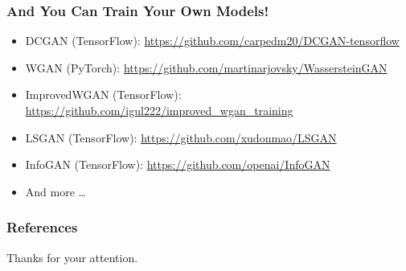 \begin{frame}
  \frametitle{And You Can Train Your Own Models!}
  \begin{itemize}
    \item DCGAN (TensorFlow):
      \url{https://github.com/carpedm20/DCGAN-tensorflow}
    \item WGAN (PyTorch):
      \url{https://github.com/martinarjovsky/WassersteinGAN}
    \item ImprovedWGAN (TensorFlow):
      \url{https://github.com/igul222/improved_wgan_training}
    \item LSGAN (TensorFlow):
      \url{https://github.com/xudonmao/LSGAN}
    \item InfoGAN (TensorFlow):
      \url{https://github.com/openai/InfoGAN}
    \item And more \ldots
  \end{itemize}
\end{frame}

\renewcommand*{\bibfont}{\scriptsize}
\begin{frame}
  \frametitle{References}
  \nocite{*}
  \printbibliography
\end{frame}

\begin{frame}
  \vspace{1em}
  \begin{center}
    \Huge \color{BlueViolet}
    Thanks for your attention.
  \end{center}
\end{frame}
